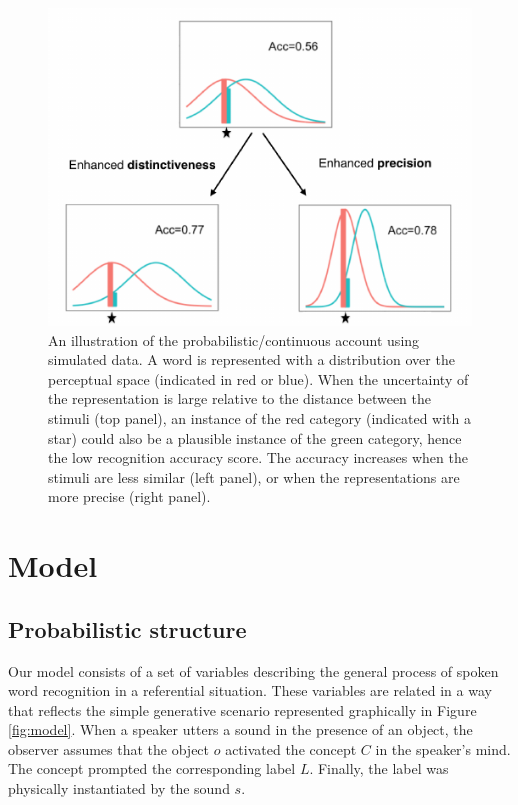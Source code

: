 \documentclass[10pt, letterpaper]{article}
\newenvironment{CodeChunk}{}{}
\begin{document}
\begin{CodeChunk}
\begin{figure}[H]

{\centering \includegraphics{figs/illus-1} 

}

\caption[An illustration of the probabilistic/continuous account using simulated data]{An illustration of the probabilistic/continuous account using simulated data. A word is represented with a distribution over the perceptual space (indicated in red or blue). When the uncertainty of the representation is large relative to the distance between the stimuli (top panel), an instance of the red category (indicated with a star) could also be a plausible instance of the green category, hence the low recognition accuracy score. The accuracy increases when the stimuli are less similar (left panel), or when the representations are more precise (right panel).}\label{fig:illus}
\end{figure}
\end{CodeChunk}

\section{Model}\label{model}

\subsection{Probabilistic structure}\label{probabilistic-structure}

Our model consists of a set of variables describing the general process
of spoken word recognition in a referential situation. These variables
are related in a way that reflects the simple generative scenario
represented graphically in Figure \ref{fig:model}. When a speaker utters
a sound in the presence of an object, the observer assumes that the
object \(o\) activated the concept \(C\) in the speaker's mind. The
concept prompted the corresponding label \(L\). Finally, the label was
physically instantiated by the sound \(s\).
\end{document}
